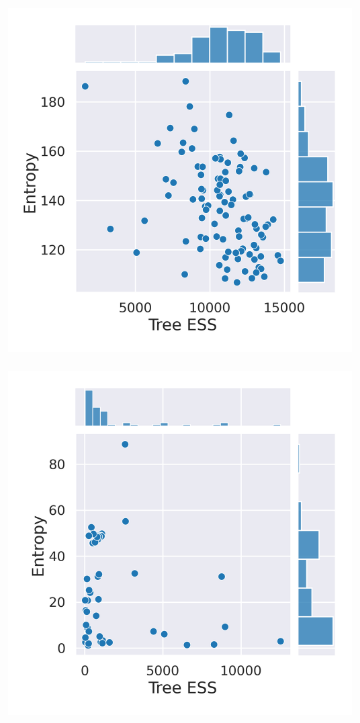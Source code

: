 \documentclass[10pt,letterpaper]{article}
\begin{document}
\begin{figure}
	\begin{subfigure}[b]{0.4\textwidth}
		\centering
		\includegraphics[width=\textwidth]{figures/yule-400-ccd1-entropy-ess.png}
	\end{subfigure}
	\begin{subfigure}[b]{0.4\textwidth}
		\centering
		\includegraphics[width=\textwidth]{figures/bio-ccd1-entropy-ess.png}
	\end{subfigure}
	
	\label{fig:effective-sample-size-entropy}
\end{figure}
\end{document}
